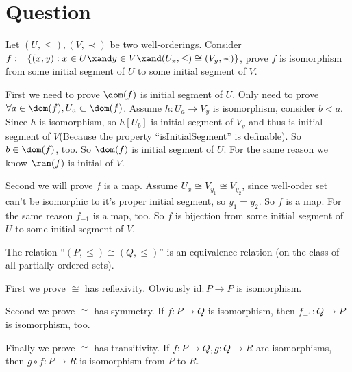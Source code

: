 \documentclass{ctexart}
\newif\ifpreface
\begin{document}
\large
\setlength{\baselineskip}{1.2em}
\ifpreface
 
\else
\maketitle
\fi
{}
\section{Question}
\begin{problem}
 Let $(U,\le),(V,\prec)$ be two well-orderings. Consider $f:=\{(x,y):x\in U\xand y\in V\xand (U_x,\le)\cong (V_y,\prec)\}$, prove $f$ is isomorphism from some initial segment of $U$ to some initial segment of $V$. 
\end{problem}
\begin{solution}
 First we need to prove $\dom(f)$ is initial segment of $U$. Only need to prove $\forall a\in \dom(f),U_a\subset \dom(f)$. 
 Assume $h:U_a\to V_y$ is isomorphism, consider $b<a$. 
 Since $h$ is isomorphism, so $h[U_b]$ is initial segment of $V_y$ and thus is initial segment of $V$(Because the property ``isInitialSegment'' is definable). So $b\in \dom(f)$, too. So $\dom(f)$ is initial segment of $U$. 
 For the same reason we know $\ran(f)$ is initial of $V$. 

 Second we will prove $f$ is a map. Assume $U_x\cong V_{y_1}\cong V_{y_2}$, since well-order set can't be isomorphic to it's proper initial segment, so $y_1=y_2$. So $f$ is a map. For the same reason $f_{-1}$ is a map, too. So $f$ is bijection from some initial segment of $U$ to some initial segment of $V$.
\end{solution}

\begin{problem}\label{pro:2}
 The relation ``$(P,\le)\cong(Q,\le)$'' is an equivalence relation (on the class of all partially ordered sets).
\end{problem}

\begin{solution}
 First we prove $\cong$ has reflexivity. Obviously $\mathrm{id}:P\to P$ is isomorphism. 

 Second we prove $\cong$ has symmetry. If $f:P\to Q$ is isomorphism, then $f_{-1}:Q\to P$ is isomorphism, too. 

 Finally we prove $\cong$ has transitivity. If $f:P\to Q,g:Q\to R$ are isomorphisms, then $g\circ f:P\to R$ is isomorphism from $P$ to $R$. 
\end{solution}
\end{document}
